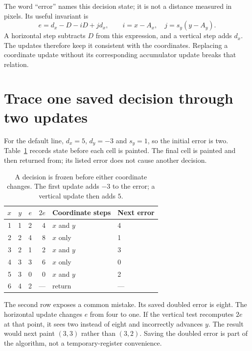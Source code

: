 The word ``error'' names this decision state; it is not a distance measured in
pixels. Its useful invariant is
\[
  e=d_x-D-iD+jd_x,
  \qquad i=x-A_x,\quad j=s_y(y-A_y).
\]
A horizontal step subtracts $D$ from this expression, and a vertical step adds
$d_x$. The updates therefore keep it consistent with the coordinates. Replacing a
coordinate update without its corresponding accumulator update breaks that relation.

\section{Trace one saved decision through two updates}

For the default line, $d_x=5$, $d_y=-3$ and $s_y=1$, so the initial error is two.
Table~\ref{tab:revision-line-state} records state before each cell is painted.
The final cell is painted and then returned from; its listed error does not cause
another decision.

\begin{table}[htbp]
  \centering
  \begin{tabular}{rrrrll}
    \toprule
    $x$ & $y$ & $e$ & $2e$ & Coordinate steps & Next error \\
    \midrule
    1   & 1   & 2   & 4    & $x$ and $y$      & 4          \\
    2   & 2   & 4   & 8    & $x$ only         & 1          \\
    3   & 2   & 1   & 2    & $x$ and $y$      & 3          \\
    4   & 3   & 3   & 6    & $x$ only         & 0          \\
    5   & 3   & 0   & 0    & $x$ and $y$      & 2          \\
    6   & 4   & 2   & ---  & return           & ---        \\
    \bottomrule
  \end{tabular}
  \caption{A decision is frozen before either coordinate changes. The first update adds $-3$ to the error; a vertical update then adds $5$.}
  \label{tab:revision-line-state}
\end{table}

The second row exposes a common mistake. Its saved doubled error is eight. The
horizontal update changes $e$ from four to one. If the vertical test recomputes
$2e$ at that point, it sees two instead of eight and incorrectly advances $y$.
The result would next paint $(3,3)$ rather than $(3,2)$. Saving the doubled error
is part of the algorithm, not a temporary-register convenience.

